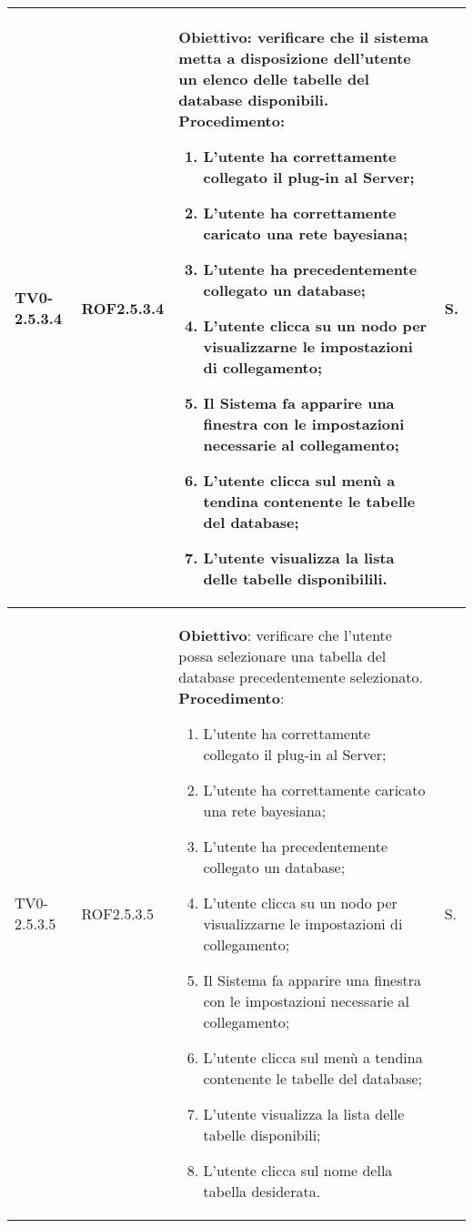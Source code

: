 \begin{longtable}{|C{.15\textwidth}|C{.13\textwidth}|m{.65\textwidth}|C{.08\textwidth}|}
TV0-2.5.3.4 & ROF2.5.3.4 &
	\textbf{Obiettivo}: verificare che il sistema metta a disposizione dell'utente un elenco delle tabelle del database disponibili. \newline
	\textbf{Procedimento}:
	\begin{enumerate}
		\item L'utente ha correttamente collegato il plug-in al Server;
		\item L'utente ha correttamente caricato una rete bayesiana;
		\item L'utente ha precedentemente collegato un database;
		\item L'utente clicca su un nodo per visualizzarne le impostazioni di collegamento;
		\item Il Sistema fa apparire una finestra con le impostazioni necessarie al collegamento;
		\item L'utente clicca sul menù a tendina contenente le tabelle del database;
		\item L'utente visualizza la lista delle tabelle disponibilili.
			\end{enumerate} & S. \\
\hline

TV0-2.5.3.5 & ROF2.5.3.5 &
	\textbf{Obiettivo}: verificare che l'utente possa selezionare una tabella del database precedentemente selezionato. \newline
	\textbf{Procedimento}:
	\begin{enumerate}
		\item L'utente ha correttamente collegato il plug-in al Server;
		\item L'utente ha correttamente caricato una rete bayesiana;
		\item L'utente ha precedentemente collegato un database;
		\item L'utente clicca su un nodo per visualizzarne le impostazioni di collegamento;
		\item Il Sistema fa apparire una finestra con le impostazioni necessarie al collegamento;
		\item L'utente clicca sul menù a tendina contenente le tabelle del database;
		\item L'utente visualizza la lista delle tabelle disponibili;
		\item L'utente clicca sul nome della tabella desiderata.
			\end{enumerate} & S. \\
\hline


\end{longtable}
